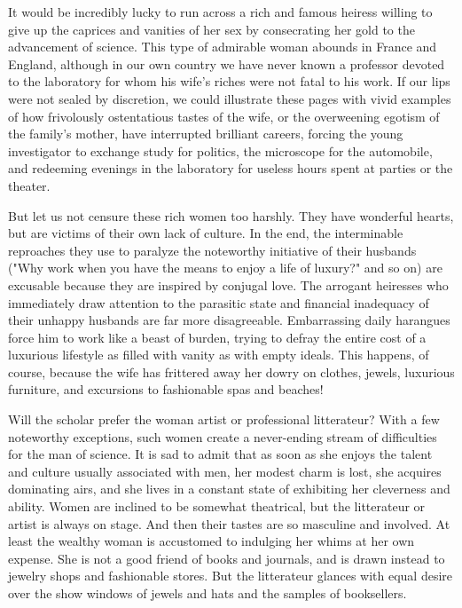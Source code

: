\documentclass{article}
\begin{document}
It would be incredibly lucky to run across a rich and famous heiress willing to give up the caprices and vanities of her sex by consecrating her gold to the advancement of science. This type of admirable woman abounds in France and England, although in our own country we have never known a professor devoted to the laboratory for whom his wife’s riches were not fatal to his work. If our lips were not sealed by discretion, we could illustrate these pages with vivid examples of how frivolously ostentatious tastes of the wife, or the overweening egotism of the family’s mother, have interrupted brilliant careers, forcing the young investigator to exchange study for politics, the microscope for the automobile, and redeeming evenings in the laboratory for useless hours spent at parties or the theater.

But let us not censure these rich women too harshly. They have wonderful hearts, but are victims of their own lack of culture. In the end, the interminable reproaches they use to paralyze the noteworthy initiative of their husbands ("Why work when you have the means to enjoy a life of luxury?" and so on) are excusable because they are inspired by conjugal love. The arrogant heiresses who immediately draw attention to the parasitic state and financial inadequacy of their unhappy husbands are far more disagreeable. Embarrassing daily harangues force him to work like a beast of burden, trying to defray the entire cost of a luxurious lifestyle as filled with vanity as with empty ideals. This happens, of course, because the wife has frittered away her dowry on clothes, jewels, luxurious furniture, and excursions to fashionable spas and beaches!

Will the scholar prefer the woman artist or professional litterateur? With a few noteworthy exceptions, such women create a never-ending stream of difficulties for the man of science. It is sad to admit that as soon as she enjoys the talent and culture usually associated with men, her modest charm is lost, she acquires dominating airs, and she lives in a constant state of exhibiting her cleverness and ability. Women are inclined to be somewhat theatrical, but the litterateur or artist is always on stage. And then their tastes are so masculine and involved. At least the wealthy woman is accustomed to indulging her whims at her own expense. She is not a good friend of books and journals, and is drawn instead to jewelry shops and fashionable stores. But the litterateur glances with equal desire over the show windows of jewels and hats and the samples of booksellers.
\end{document}
